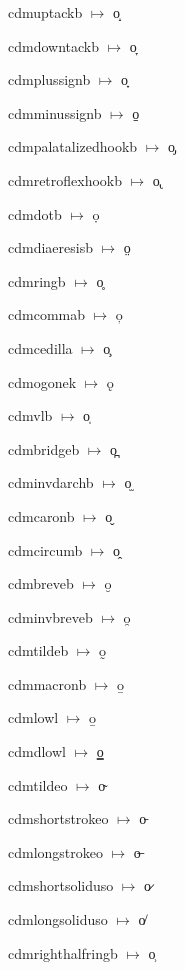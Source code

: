 {\noindent cdmuptackb $\mapsto$ {\cdmformat o̝}\par
\noindent cdmdowntackb $\mapsto$ {\cdmformat o̞}\par
\noindent cdmplussignb $\mapsto$ {\cdmformat o̟}\par
\noindent cdmminussignb $\mapsto$ {\cdmformat o̠}\par
\noindent cdmpalatalizedhookb $\mapsto$ {\cdmformat o̡}\par
\noindent cdmretroflexhookb $\mapsto$ {\cdmformat o̢}\par
\noindent cdmdotb $\mapsto$ {\cdmformat ọ}\par
\noindent cdmdiaeresisb $\mapsto$ {\cdmformat o̤}\par
\noindent cdmringb $\mapsto$ {\cdmformat o̥}\par
\noindent cdmcommab $\mapsto$ {\cdmformat o̦}\par
\noindent cdmcedilla $\mapsto$ {\cdmformat o̧}\par
\noindent cdmogonek $\mapsto$ {\cdmformat ǫ}\par
\noindent cdmvlb $\mapsto$ {\cdmformat o̩}\par
\noindent cdmbridgeb $\mapsto$ {\cdmformat o̪}\par
\noindent cdminvdarchb $\mapsto$ {\cdmformat o̫}\par
\noindent cdmcaronb $\mapsto$ {\cdmformat o̬}\par
\noindent cdmcircumb $\mapsto$ {\cdmformat o̭}\par
\noindent cdmbreveb $\mapsto$ {\cdmformat o̮}\par
\noindent cdminvbreveb $\mapsto$ {\cdmformat o̯}\par
\noindent cdmtildeb $\mapsto$ {\cdmformat o̰}\par
\noindent cdmmacronb $\mapsto$ {\cdmformat o̱}\par
\noindent cdmlowl $\mapsto$ {\cdmformat o̲}\par
\noindent cdmdlowl $\mapsto$ {\cdmformat o̳}\par
\noindent cdmtildeo $\mapsto$ {\cdmformat o̴}\par
\noindent cdmshortstrokeo $\mapsto$ {\cdmformat o̵}\par
\noindent cdmlongstrokeo $\mapsto$ {\cdmformat o̶}\par
\noindent cdmshortsoliduso $\mapsto$ {\cdmformat o̷}\par
\noindent cdmlongsoliduso $\mapsto$ {\cdmformat o̸}\par
\noindent cdmrighthalfringb $\mapsto$ {\cdmformat o̹}\par
}
